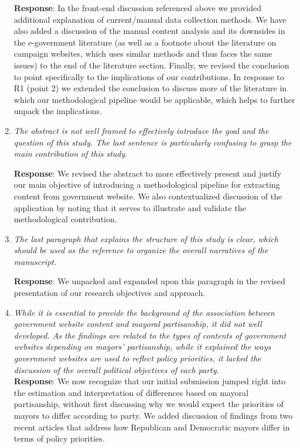 \documentclass[12pt,titlepage]{article}
\begin{document}
\begin{enumerate}
    
    \textbf{Response}: In the front-end discussion referenced above we provided additional explanation of current/manual data collection methods. We have also added a discussion of the manual content analysis and its downsides in the e-government literature (as well as a footnote about the literature on campaign websites, which uses similar methods and thus faces the same issues) to the end of the literature section. Finally, we revised the conclusion to point specifically to the implications of our contributions. In response to R1 (point 2) we extended the conclusion to discuss more of the literature in which our methodological pipeline would be applicable, which helps to further unpack the implications.
    
    

\item \emph{The abstract is not well framed to effectively introduce the goal and the question of this study. The last sentence is particularly confusing to grasp the main contribution of this study.}

     \textbf{Response}:  We revised the abstract to more effectively present and justify our main objective of introducing a methodological pipeline for extracting content from government website. We also contextualized discussion of the application by noting that it serves to illustrate and validate the methodological contribution.


\item \emph{The last paragraph that explains the structure of this study is clear, which should be used as the reference to organize the overall narratives of the manuscript.}

     \textbf{Response}: We unpacked and expanded upon this paragraph in the revised presentation of our research objectives and approach. 


\item \emph{ While it is essential to provide the background of the association between government website content and mayoral partisanship, it did not well developed. As the findings are related to the types of contents of government websites depending on mayors’ partisanship, while it explained the ways government websites are used to reflect policy priorities, it lacked the discussion of the overall political objectives of each party. }\\

    \textbf{Response}: We now recognize that our initial submission jumped right into the estimation and interpretation of differences based on mayoral partisanship, without first discussing why we would expect the priorities of mayors to differ according to party. We added discussion of findings from two recent articles that address how Republican and Democratic mayors differ in terms of policy priorities.
    

\end{enumerate}
\end{document}
